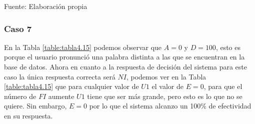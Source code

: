 \begin{center}
\begin{table}[H]
\centering
\caption{\small{Resultados para obtener U1 en el caso 6.}}
\label{table:tabla4.14}
\vskip 0.2cm
\begin{center}
\vskip 0.2cm
{\small{Fuente: Elaboración propia}}
\end{center}
\end{table}
\end{center}

\subsubsection{Caso 7}
En la Tabla \ref{table:tabla4.15} podemos observar que $A = 0$ y $D = 100$, esto es porque el usuario pronunció una palabra distinta a las que se encuentran en la base de datos.
\vskip 0.5cm
Ahora en cuanto a la respuesta de decisión del sistema para este caso la única respuesta correcta será $NI$, podemos ver en la Tabla \ref{table:tabla4.15} que para cualquier valor de $U1$ el valor de $E = 0$, para que el número de $FI$ aumente $U1$ tiene que ser más grande, pero esto es lo que no se quiere. Sin embargo, $E = 0$ por lo que el sistema alcanzo un 100\% de efectividad en su respuesta.

